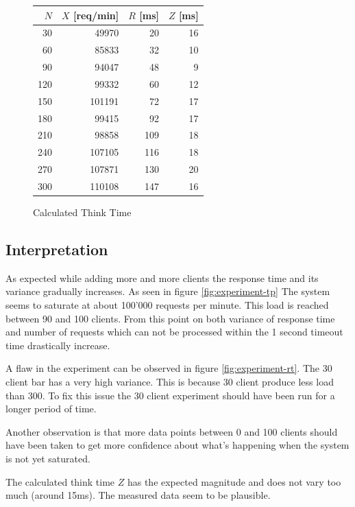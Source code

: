 \documentclass[a4paper]{article}
\begin{document}
\begin{figure}[H]
\label{tabular:experimentsanitycheck}
\begin{center}
\begin{tabular}{|r|r|r|r|}
\hline 
$N$ & $X$ [req/min] & $R$ [ms] & $Z$ [ms]\\
\hline 
30&	49970&	20&	16\\
60&	85833&	32&	10\\
90&	94047&	48&	9\\
120&	99332&	60&	12\\
150&	101191&	72&	17\\
180&	99415&	92&	17\\
210&	98858&	109&	18\\
240&	107105&	116&	18\\
270&	107871&	130&	20\\
300&	110108&	147&	16\\
\hline 
\end{tabular} 
\caption{Calculated Think Time}
\end{center}
\end{figure}


\subsection{Interpretation}

As expected while adding more and more clients the response time and its variance gradually increases. As seen in figure \ref{fig:experiment-tp} The system seems to saturate at about 100'000 requests per minute. This load is reached between 90 and 100 clients. From this point on both variance of response time and number of requests which can not be processed within the 1 second timeout time drastically increase.

A flaw in the experiment can be observed in figure \ref{fig:experiment-rt}. The 30 client bar has a very high variance. This is because 30 client produce less load than 300. To fix this issue the 30 client experiment should have been run for a longer period of time.

Another observation is that more data points between 0 and 100 clients should have been taken to get more confidence about what's happening when the system is not yet saturated.

The calculated think time $Z$ has the expected magnitude and does not vary too much (around 15ms). The measured data seem to be plausible.


\pagebreak




\end{document}

